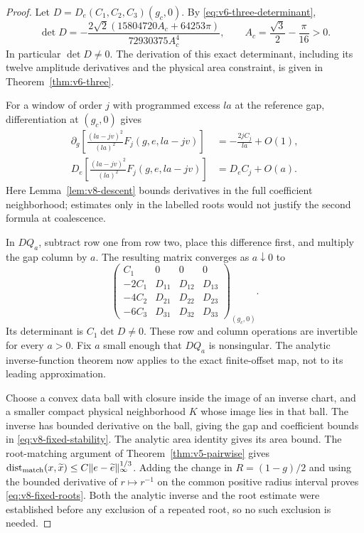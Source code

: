 \begin{proof}
Let $D=D_e(C_1,C_2,C_3)(g_c,0)$. By
\eqref{eq:v6-three-determinant},
\begin{equation}\label{eq:v8-D}
 \det D=-\frac{2\sqrt2(15804720 A_c+64253\pi)}{72930375 A_c^4},
       \qquad A_c=\frac{\sqrt3}{2}-\frac\pi{16}>0.
\end{equation}
In particular $\det D\ne0$. The derivation of this exact determinant,
including its twelve amplitude derivatives and the physical area
constraint, is given in Theorem~\ref{thm:v6-three}.

For a window of order $j$ with programmed excess $la$ at the reference
gap, differentiation at $(g_c,0)$ gives
\[
 \begin{aligned}
 \partial_g\left[\frac{(la-jv)^2}{(la)^2}
                  F_j(g,e,la-jv)\right]
       &=-\frac{2jC_j}{la}+O(1),\\
 D_e\left[\frac{(la-jv)^2}{(la)^2}
                  F_j(g,e,la-jv)\right]&=D_eC_j+O(a).
 \end{aligned}
\]
Here Lemma~\ref{lem:v8-descent} bounds derivatives in the full
coefficient neighborhood; estimates only in the labelled roots would
not justify the second formula at coalescence.

In $DQ_a$, subtract row one from row two, place this difference first,
and multiply the gap column by $a$. The resulting matrix converges as
$a\downarrow0$ to
\begin{equation}\label{eq:v8-block}
 \begin{pmatrix}
 C_1&0&0&0\\
 -2C_1&D_{11}&D_{12}&D_{13}\\
 -4C_2&D_{21}&D_{22}&D_{23}\\
 -6C_3&D_{31}&D_{32}&D_{33}
 \end{pmatrix}_{(g_c,0)}.
\end{equation}
Its determinant is $C_1\det D\ne0$. These row and column operations
are invertible for every $a>0$. Fix $a$ small enough that $DQ_a$ is
nonsingular. The analytic inverse-function theorem now applies to the
exact finite-offset map, not to its leading approximation.

Choose a convex data ball with closure inside the image of an inverse
chart, and a smaller compact physical neighborhood $K$ whose image
lies in that ball. The inverse has bounded derivative on the ball,
giving the gap and coefficient bounds in
\eqref{eq:v8-fixed-stability}. The analytic area identity gives its area
bound. The root-matching argument of Theorem~\ref{thm:v5-pairwise}
gives $\operatorname{dist}_{\rm match}(x,\widetilde x)
\le C\|e-\widetilde e\|_\infty^{1/3}$. Adding the change in
$R=(1-g)/2$ and using the bounded derivative of $r\mapsto r^{-1}$ on
the common positive radius interval proves \eqref{eq:v8-fixed-roots}.
Both the analytic inverse and the root estimate were established before
any exclusion of a repeated root, so no such exclusion is needed.
\end{proof}

